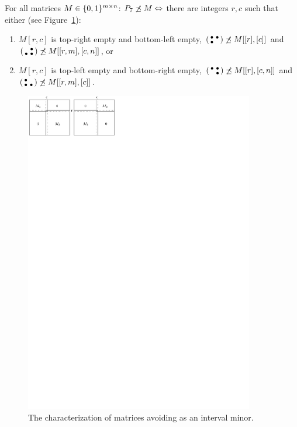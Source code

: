 \begin{prop}
\label{prop:p33}
For all matrices $M\in\{0,1\}^{m\times n}$: $P_7\not\preceq M\Leftrightarrow$ there are integers $r,c$ such that either (see Figure~\ref{fig:p33}):
\begin{enumerate}
	\item $M[r,c]$ is top-right empty and bottom-left empty, $\left(\begin{smallmatrix}\bullet&\bullet\\\bullet& \end{smallmatrix}\right)\not\preceq M[[r],[c]]$ and $\left(\begin{smallmatrix} &\bullet\\\bullet&\bullet\end{smallmatrix}\right)\not\preceq M[[r,m],[c,n]]$, or
	\item $M[r,c]$ is top-left empty and bottom-right empty, $\left(\begin{smallmatrix}\bullet&\bullet\\ &\bullet\end{smallmatrix}\right)\not\preceq M[[r],[c,n]]$ and $\left(\begin{smallmatrix}\bullet& \\\bullet&\bullet\end{smallmatrix}\right)\not\preceq M[[r,m],[c]]$.
\end{enumerate}
\end{prop}
\begin{figure}[!ht]
\centering
\includegraphics[width=100mm]{img/p33.pdf}
\caption{The characterization of matrices avoiding \usebox{\smlmatb} as an interval minor.}
\label{fig:p33}
\end{figure}
